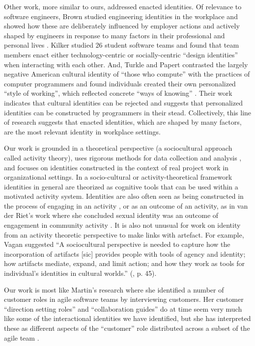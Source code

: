 \documentclass{chi2009}
\begin{document}
Other work, more similar to ours, addressed enacted identities.  Of relevance to software engineers, Brown studied engineering identities in the workplace and showed how these are deliberately influenced by employer actions and actively shaped by engineers in response to many factors in their professional and personal lives \cite{Brown2004}.  Kilker studied 26 student software teams and found that team members enact either technology-centric or socially-centric ``design identities'' \cite{Kilker1999} when interacting with each other.  And, Turkle and Papert contrasted the largely negative American cultural identity of  ``those who compute'' with the practices of computer programmers and found individuals created their own personalized ``style of working'', which reflected concrete ``ways of knowing'' \cite{TurkleandPapert1990}. Their work indicates that cultural identities can be rejected and suggests that personalized identities can be  constructed by programmers in their stead.  Collectively, this line of research suggests that enacted identities, which are shaped by many factors, are the most relevant identity in workplace settings. 

Our work is grounded in a theoretical perspective (a sociocultural approach called activity theory), uses rigorous methods for data collection and analysis \cite{Adler1994, Smith1995}, and focuses on identities constructed in the context of real project work in organizational settings.  In a socio-cultural or activity-theoretical framework \cite{Vygotsky1978, Engestrom2000, Daniels2008, Brown2007b, Wertsch1998} identities in general are theorized as cognitive tools that can be used within a motivated activity system.  Identities are also often seen as being constructed in the process of engaging in an activity \cite{Bucholtz2005}, or as an outcome of an activity, as in van der Riet's work where she concluded sexual identity was an outcome of engagement in community activity \cite{vanderRiet2009}.  It is also not unusual for work on identity from an activity theoretic perspective to make links with artefact.  For example, Vagan suggested ``A sociocultural perspective is needed to capture how the incorporation of artifacts [sic] provides people with tools of agency and identity; how artifacts mediate, expand, and limit action; and how they work as tools for individual's identities in cultural worlds.'' (\cite{Vagan2011}, p. 45).  

Our work is most like Martin's research where she identified a number of customer roles in agile software teams by interviewing customers.  Her customer ``direction setting roles'' and ``collaboration guides'' do at time seem very much like some of the interactional identities we have identified, but she has interpreted these as different aspects of the ``customer'' role distributed across a subset of the agile team \cite{Martin2009a}.  
\end{document}
